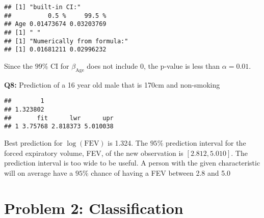 \documentclass[]{article}
\newenvironment{Shaded}{\begin{snugshade}}{\end{snugshade}}
\newcommand{\KeywordTok}[1]{\textcolor[rgb]{0.13,0.29,0.53}{\textbf{#1}}}
\newcommand{\DataTypeTok}[1]{\textcolor[rgb]{0.13,0.29,0.53}{#1}}
\newcommand{\DecValTok}[1]{\textcolor[rgb]{0.00,0.00,0.81}{#1}}
\newcommand{\FloatTok}[1]{\textcolor[rgb]{0.00,0.00,0.81}{#1}}
\newcommand{\StringTok}[1]{\textcolor[rgb]{0.31,0.60,0.02}{#1}}
\newcommand{\CommentTok}[1]{\textcolor[rgb]{0.56,0.35,0.01}{\textit{#1}}}
\newcommand{\ControlFlowTok}[1]{\textcolor[rgb]{0.13,0.29,0.53}{\textbf{#1}}}
\newcommand{\NormalTok}[1]{#1}
\begin{document}
\begin{verbatim}
## [1] "built-in CI:"
##          0.5 %     99.5 %
## Age 0.01473674 0.03203769
## [1] " "
## [1] "Numerically from formula:"
## [1] 0.01681211 0.02996232
\end{verbatim}

Since the \(99\%\) CI for \(\beta_{\text{Age}}\) does not include \(0\),
the p-value is less than \(\alpha = 0.01\).

\textbf{Q8:} Prediction of a 16 year old male that is 170cm and
non-smoking

\begin{Shaded}
\end{Shaded}

\begin{verbatim}
##        1 
## 1.323802 
##       fit      lwr      upr
## 1 3.75768 2.818373 5.010038
\end{verbatim}

Best prediction for \(\log(\text{FEV})\) is 1.324. The \(95\%\)
prediction interval for the forced expiratory volume, FEV, of the new
observation is \([2.812, 5.010]\). The prediction interval is too wide
to be useful. A person with the given characteristic will on average
have a \(95\%\) chance of having a FEV between 2.8 and 5.0

\section{Problem 2: Classification}\label{problem-2-classification}
\end{document}
